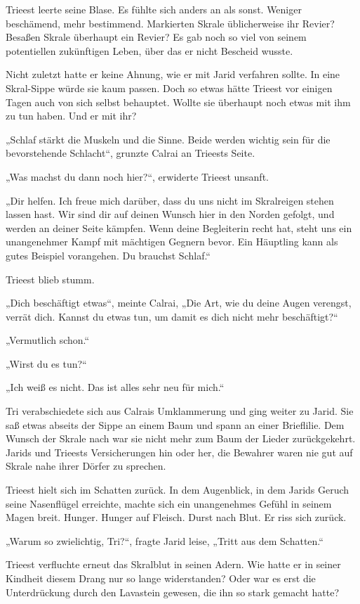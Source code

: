 Trieest leerte seine Blase. Es fühlte sich anders an als sonst. Weniger beschämend, mehr bestimmend. Markierten Skrale üblicherweise ihr Revier? Besaßen Skrale überhaupt ein Revier? Es gab noch so viel von seinem potentiellen zukünftigen Leben, über das er nicht Bescheid wusste.

Nicht zuletzt hatte er keine Ahnung, wie er mit Jarid verfahren sollte. In eine Skral-Sippe würde sie kaum passen. Doch so etwas hätte Trieest vor einigen Tagen auch von sich selbst behauptet. Wollte sie überhaupt noch etwas mit ihm zu tun haben. Und er mit ihr?

„Schlaf stärkt die Muskeln und die Sinne. Beide werden wichtig sein für die bevorstehende Schlacht“, grunzte Calrai an Trieests Seite.

„Was machst du dann noch hier?“, erwiderte Trieest unsanft.

„Dir helfen. Ich freue mich darüber, dass du uns nicht im Skralreigen stehen lassen hast. Wir sind dir auf deinen Wunsch hier in den Norden gefolgt, und werden an deiner Seite kämpfen. Wenn deine Begleiterin recht hat, steht uns ein unangenehmer Kampf mit mächtigen Gegnern bevor. Ein Häuptling kann als gutes Beispiel vorangehen. Du brauchst Schlaf.“

Trieest blieb stumm.

„Dich beschäftigt etwas“, meinte Calrai, „Die Art, wie du deine Augen verengst, verrät dich. Kannst du etwas tun, um damit es dich nicht mehr beschäftigt?“

„Vermutlich schon.“

„Wirst du es tun?“

„Ich weiß es nicht. Das ist alles sehr neu für mich.“

Tri verabschiedete sich aus Calrais Umklammerung und ging weiter zu Jarid. Sie saß etwas abseits der Sippe an einem Baum und spann an einer Brieflilie. Dem Wunsch der Skrale nach war sie nicht mehr zum Baum der Lieder zurückgekehrt. Jarids und Trieests Versicherungen hin oder her, die Bewahrer waren nie gut auf Skrale nahe ihrer Dörfer zu sprechen.

Trieest hielt sich im Schatten zurück. In dem Augenblick, in dem Jarids Geruch seine Nasenflügel erreichte, machte sich ein unangenehmes Gefühl in seinem Magen breit. Hunger. Hunger auf Fleisch. Durst nach Blut. Er riss sich zurück.

„Warum so zwielichtig, Tri?“, fragte Jarid leise, „Tritt aus dem Schatten.“

Trieest verfluchte erneut das Skralblut in seinen Adern. Wie hatte er in seiner Kindheit diesem Drang nur so lange widerstanden? Oder war es erst die Unterdrückung durch den Lavastein gewesen, die ihn so stark gemacht hatte?

